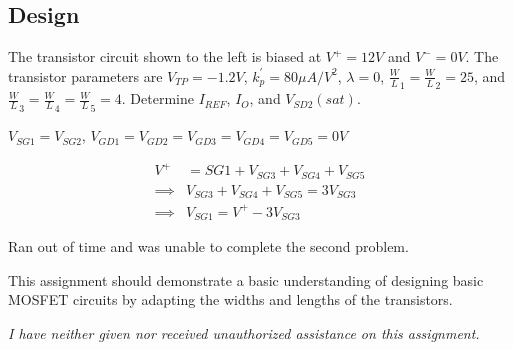 \documentclass[12pt,letterpaper,titlepage]{article}
\begin{document}
\begin{raggedright}
\begin{paracol}{2}
\subsection{Design}
The transistor circuit shown to the left is biased at $V^+ = 12V$ and $V^- = 0V$. The transistor parameters are $V_{TP} = -1.2V$, $k_p^\prime = 80\mu A/V^2$, $\lambda = 0$, $\frac{W}{L}_1 = \frac{W}{L}_2 = 25$, and $\frac{W}{L}_3 = \frac{W}{L}_4 = \frac{W}{L}_5 = 4$. Determine $I_{REF}$, $I_O$, and $V_{SD2}(sat)$.

$V_{SG1} = V_{SG2}$, $V_{GD1} = V_{GD2} = V_{GD3} = V_{GD4} = V_{GD5} = 0V$

\begin{align*}
   V^+ &= {SG1} + V_{SG3} + V_{SG4} + V_{SG5} 
\\\implies& V_{SG3} + V_{SG4} + V_{SG5} = 3V_{SG3}
\\\implies& V_{SG1} = V^+ - 3V_{SG3}
\end{align*}

Ran out of time and was unable to complete the second problem. 


\end{paracol}
%

This assignment should demonstrate a basic understanding of designing basic MOSFET circuits by adapting the widths and lengths of the transistors.

\textit{I have neither given nor received unauthorized assistance on this assignment.}


\end{raggedright}
\end{document}
